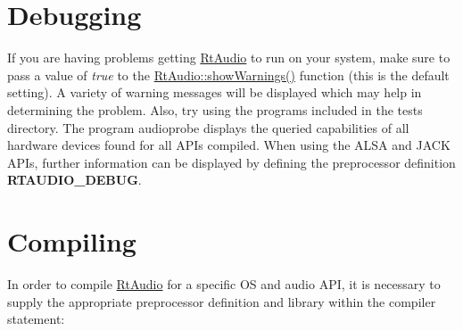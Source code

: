 \hypertarget{compiling_debug}{}\section{Debugging}\label{compiling_debug}
If you are having problems getting \hyperlink{class_rt_audio}{Rt\+Audio} to run on your system, make sure to pass a value of {\itshape true} to the \hyperlink{class_rt_audio_af0752ee51cce3dd90a3bd009f9fdbe77}{Rt\+Audio\+::show\+Warnings()} function (this is the default setting). A variety of warning messages will be displayed which may help in determining the problem. Also, try using the programs included in the {\ttfamily tests} directory. The program {\ttfamily audioprobe} displays the queried capabilities of all hardware devices found for all A\+P\+Is compiled. When using the A\+L\+SA and J\+A\+CK A\+P\+Is, further information can be displayed by defining the preprocessor definition {\bfseries R\+T\+A\+U\+D\+I\+O\+\_\+\+D\+E\+B\+UG}.\hypertarget{compiling_compile}{}\section{Compiling}\label{compiling_compile}
In order to compile \hyperlink{class_rt_audio}{Rt\+Audio} for a specific OS and audio A\+PI, it is necessary to supply the appropriate preprocessor definition and library within the compiler statement\+: 

